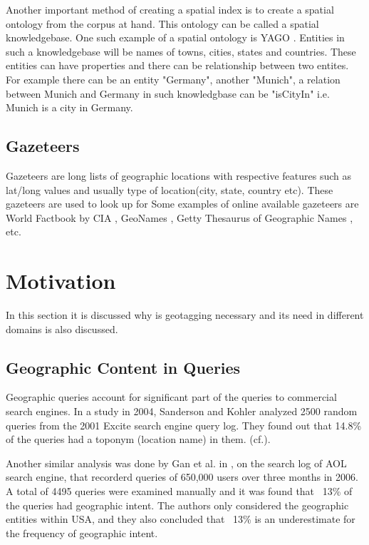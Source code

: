 \documentclass[
     11pt,         %
     a4paper,      %
     oneside,
     ]{article}
\begin{document}
Another important method of creating a spatial index is to create a spatial ontology from the corpus at hand. This ontology can be called a spatial knowledgebase. One such example of a spatial ontology is YAGO \cite{yago-website}. Entities in such a knowledgebase will be names of towns, cities, states and countries. These entities can have properties and there can be relationship between two entites. For example there can be an entity "Germany", another "Munich", a relation between Munich and Germany in such knowledgbase can be "isCityIn" i.e. Munich is a city in Germany.

\subsection{Gazeteers} 
Gazeteers are long lists of geographic locations with respective features such as lat/long values and usually type of location(city, state, country etc). These gazeteers are used to look up for Some examples of online available gazeteers are World Factbook by CIA \cite{gazeteer-cia}, GeoNames \cite{gazeteer-geonames}, Getty Thesaurus of Geographic Names \cite{gazeteer-getty}, etc.

\section{Motivation}\label{sec:sections}
In this section it is discussed why is geotagging necessary and its need in different domains is also discussed.
\subsection{Geographic Content in Queries}
Geographic queries account for significant part of the queries to commercial search engines. In a study in 2004, Sanderson and Kohler analyzed 2500 random queries from the 2001 Excite search engine query log. They found out that 14.8\% of the queries had a toponym (location name) in them. \cite{Sanderson04analyzinggeographic}  (cf.\cite{Leidner:2008:PhD}).

Another similar analysis was done by Gan et al. in \cite{Gan:2008:AGQ:1367798.1367806}, on the search log of AOL search engine, that recorderd queries of 650,000 users over three months in 2006. A total of 4495 queries were examined manually and it was found that ~13\% of the queries had geographic intent. The authors only considered the geographic entities within USA, and they also concluded that ~13\% is an underestimate for the frequency of geographic intent. 
\end{document}
